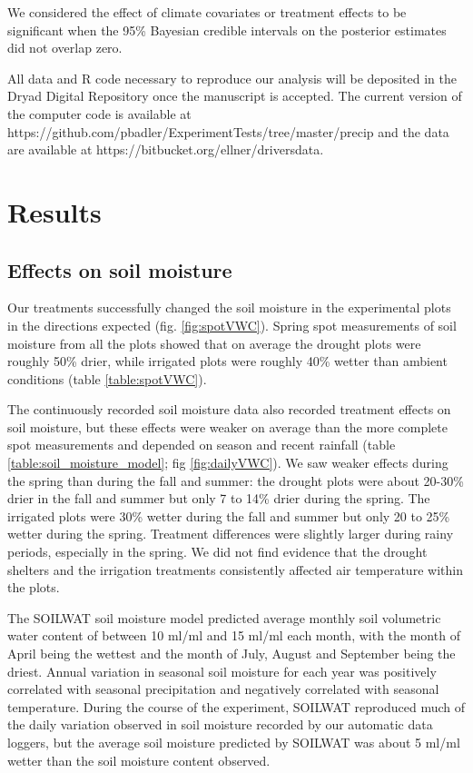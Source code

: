 \documentclass[11pt]{article}
\begin{document}
\begin{doublespacing}
We considered the effect of climate covariates or treatment effects to be significant when the 95\% Bayesian credible intervals on the posterior estimates did not overlap zero.  

All data and R code necessary to reproduce our analysis will be deposited in the Dryad Digital Repository once the manuscript is accepted. The current version of the computer code is available at https://github.com/pbadler/ExperimentTests/tree/master/precip and the data are available at https://bitbucket.org/ellner/driversdata. 

\section*{Results}

\subsection*{Effects on soil moisture}

Our treatments successfully changed the soil moisture in the experimental plots in the directions expected (fig. \ref{fig:spotVWC}). Spring spot measurements of soil moisture from all the plots showed that on average the drought plots were roughly 50\% drier, while irrigated plots were roughly 40\% wetter than ambient conditions (table \ref{table:spotVWC}).
  
The continuously recorded soil moisture data also recorded treatment effects on soil moisture, but these effects were weaker on average than the more complete spot measurements and depended on season and recent rainfall (table \ref{table:soil_moisture_model}; fig \ref{fig:dailyVWC}). We saw weaker effects during the spring than during the fall and summer: the drought plots were about 20-30\% drier in the fall and summer but only 7 to 14\% drier during the spring. The irrigated plots were 30\% wetter during the fall and summer but only 20 to 25\% wetter during the spring.  Treatment differences were slightly larger during rainy periods, especially in the spring. We did not find evidence that the drought shelters and the irrigation treatments consistently affected air temperature within the plots.  

The SOILWAT soil moisture model predicted average monthly soil volumetric water content of between 10 ml/ml and 15 ml/ml each month, with the month of April being the wettest and the month of July, August and September being the driest. Annual variation in seasonal soil moisture for each year was positively correlated with seasonal precipitation and negatively correlated with seasonal temperature. During the course of the experiment, SOILWAT reproduced much of the daily variation observed in soil moisture recorded by our automatic data loggers, but the average soil moisture predicted by SOILWAT was about 5 ml/ml wetter than the soil moisture content observed.  


\end{doublespacing}
\end{document}
